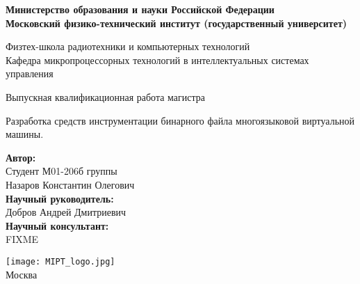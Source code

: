 \begin{center}
    \large\textbf{Министерство образования и науки Российской Федерации \\
    Московский физико-технический институт (государственный
    университет)} \\
    \vspace{1cm}

    Физтех-школа радиотехники и компьютерных технологий \\

    Кафедра микропроцессорных технологий в интеллектуальных системах управления \\

    \vspace{3em}

    Выпускная квалификационная работа магистра
\end{center}

\begin{center}
    \vspace{\fill}
    \LARGE{Разработка средств инструментации бинарного файла многоязыковой виртуальной машины.}

    \vspace{\fill}
\end{center}


\begin{flushright}
    \textbf{Автор:} \\
    Студент М01-206б группы \\
    Назаров Константин Олегович \\
    \vspace{2em}
    \textbf{Научный руководитель:} \\
    Добров Андрей Дмитриевич  \\
    \vspace{2em}
    \textbf{Научный консультант:} \\
    FIXME \\
\end{flushright}

\vspace{7em}

\begin{center}
    \texttt{[image: MIPT\_logo.jpg]}\\
    Москва \the\year{}
\end{center}

\thispagestyle{empty}

\newpage
\setcounter{page}{2}
\fancyfoot[c]{\thepage}
\fancyhead[R]{}